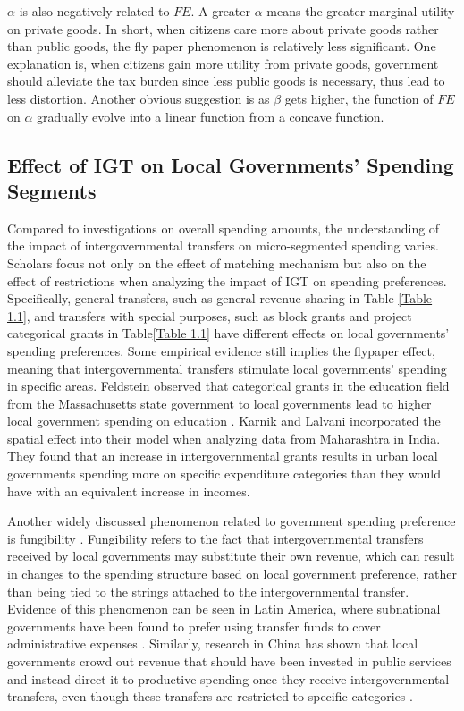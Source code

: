 $\alpha$ is also negatively related to $FE$. A greater $\alpha$ means the greater marginal utility on private goods. In short, when citizens care more about private goods rather than public goods, the fly paper phenomenon is relatively less significant. One explanation is, when citizens gain more utility from private goods, government should alleviate the tax burden since less public goods is necessary, thus lead to less distortion. Another obvious suggestion is as $\beta$ gets higher, the function of $FE$ on $\alpha$ gradually evolve into a linear function from a concave function.

\subsection{Effect of IGT on Local Governments' Spending Segments}

Compared to investigations on overall spending amounts, the understanding of the impact of intergovernmental transfers on micro-segmented spending varies. Scholars focus not only on the effect of matching mechanism but also on the effect of restrictions when analyzing the impact of IGT on spending preferences. Specifically, general transfers, such as general revenue sharing in Table \ref{Table 1.1}, and transfers with special purposes, such as block grants and project categorical grants in Table\ref{Table 1.1} have different effects on local governments' spending preferences. Some empirical evidence still implies the flypaper effect, meaning that intergovernmental transfers stimulate local governments' spending in specific areas. Feldstein observed that categorical grants in the education field from the Massachusetts state government to local governments lead to higher local government spending on education \cite{feldstein1975wealth}. Karnik and Lalvani \cite{karnik2008flypaper} incorporated the spatial effect into their model when analyzing data from Maharashtra in India. They found that an increase in intergovernmental grants results in urban local governments spending more on specific expenditure categories than they would have with an equivalent increase in incomes.

Another widely discussed phenomenon related to government spending preference is fungibility \cite{pack1993foreign}. Fungibility refers to the fact that intergovernmental transfers received by local governments may substitute their own revenue, which can result in changes to the spending structure based on local government preference, rather than being tied to the strings attached to the intergovernmental transfer. Evidence of this phenomenon can be seen in Latin America, where subnational governments have been found to prefer using transfer funds to cover administrative expenses \cite{stein1999fiscal}. Similarly, research in China has shown that local governments crowd out revenue that should have been invested in public services and instead direct it to productive spending once they receive intergovernmental transfers, even though these transfers are restricted to specific categories \cite{yinheng2011,fuyong2010}.

